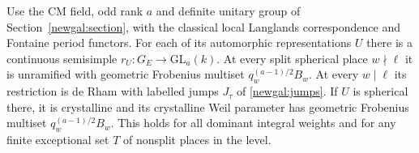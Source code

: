 \begin{proposition}
\label{addg:unitary}
Use the CM field, odd rank \(a\) and definite unitary group of
Section~\ref{newgal:section}, with the classical local Langlands
correspondence and Fontaine period functors. For each of its
automorphic representations \(U\) there is a continuous semisimple
\(r_U:G_E\to\mathrm{GL}_a(k)\). At every split spherical place
\(w\nmid\ell\) it is unramified with geometric Frobenius multiset
\(q_w^{(a-1)/2}B_w\). At every \(w\mid\ell\) its restriction is de Rham
with labelled jumps \(J_\tau\) of \eqref{newgal:jumps}. If \(U\) is
spherical there, it is crystalline and its crystalline Weil parameter
has geometric Frobenius multiset \(q_w^{(a-1)/2}B_w\).
This holds for all dominant integral weights and for any finite
exceptional set \(T\) of nonsplit places in the level.
\end{proposition}
